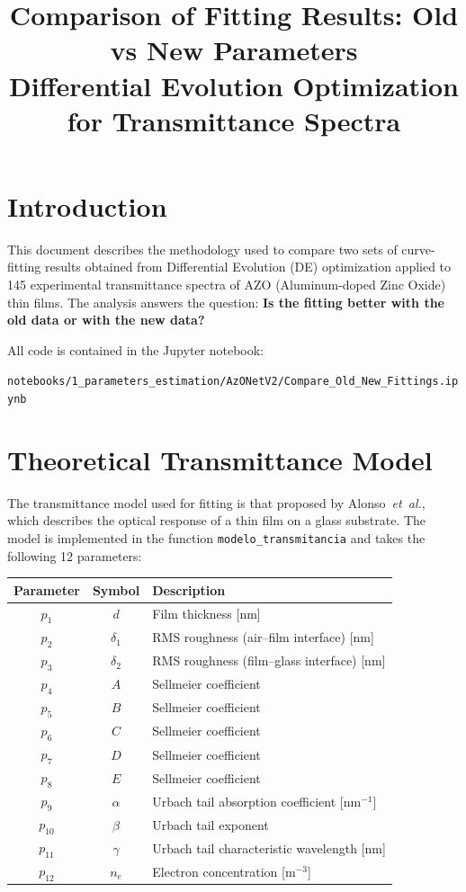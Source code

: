 \documentclass[12pt,a4paper]{article}
\title{Comparison of Fitting Results: Old vs New Parameters\\
\large Differential Evolution Optimization for Transmittance Spectra}
\author{}
\date{}
\begin{document}
\maketitle

\section{Introduction}

This document describes the methodology used to compare two sets of curve-fitting results obtained from Differential Evolution (DE) optimization applied to 145 experimental transmittance spectra of AZO (Aluminum-doped Zinc Oxide) thin films. The analysis answers the question: \textbf{Is the fitting better with the old data or with the new data?}

All code is contained in the Jupyter notebook:

\begin{center}
\texttt{notebooks/1\_parameters\_estimation/AzONetV2/Compare\_Old\_New\_Fittings.ipynb}
\end{center}

\section{Theoretical Transmittance Model}

The transmittance model used for fitting is that proposed by Alonso~\textit{et~al.}, which describes the optical response of a thin film on a glass substrate. The model is implemented in the function \texttt{modelo\_transmitancia} and takes the following 12 parameters:

\begin{center}
\begin{tabular}{ccl}
\toprule
\textbf{Parameter} & \textbf{Symbol} & \textbf{Description} \\
\midrule
$p_1$  & $d$          & Film thickness [nm] \\
$p_2$  & $\delta_1$   & RMS roughness (air--film interface) [nm] \\
$p_3$  & $\delta_2$   & RMS roughness (film--glass interface) [nm] \\
$p_4$  & $A$          & Sellmeier coefficient \\
$p_5$  & $B$          & Sellmeier coefficient \\
$p_6$  & $C$          & Sellmeier coefficient \\
$p_7$  & $D$          & Sellmeier coefficient \\
$p_8$  & $E$          & Sellmeier coefficient \\
$p_9$  & $\alpha$     & Urbach tail absorption coefficient [nm$^{-1}$] \\
$p_{10}$ & $\beta$    & Urbach tail exponent \\
$p_{11}$ & $\gamma$   & Urbach tail characteristic wavelength [nm] \\
$p_{12}$ & $n_e$      & Electron concentration [m$^{-3}$] \\
\bottomrule
\end{tabular}
\end{center}
\end{document}
